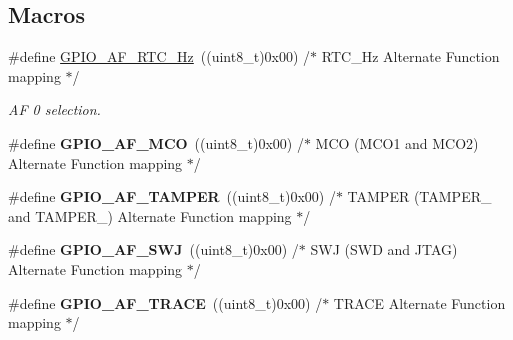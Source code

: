 \subsection*{Macros}
\begin{DoxyCompactItemize}
\item 
\mbox{\label{group___g_p_i_o___alternat__function__selection__define_ga93071f0121fab9f8f13e59c612ed6291}} 
\#define \hyperlink{group___g_p_i_o___alternat__function__selection__define_ga93071f0121fab9f8f13e59c612ed6291}{G\+P\+I\+O\+\_\+\+A\+F\+\_\+\+R\+T\+C\+\_\+Hz}~((uint8\+\_\+t)0x00)  /$\ast$ R\+T\+C\+\_\+Hz Alternate Function mapping $\ast$/
\begin{DoxyCompactList}\small\item\em AF 0 selection. \end{DoxyCompactList}\item 
\mbox{\label{group___g_p_i_o___alternat__function__selection__define_gacfe2ce01055b82d0fcdd93da513f7cc0}} 
\#define {\bfseries G\+P\+I\+O\+\_\+\+A\+F\+\_\+\+M\+CO}~((uint8\+\_\+t)0x00)  /$\ast$ M\+C\+O (\+M\+C\+O1 and M\+C\+O2) Alternate Function mapping $\ast$/
\item 
\mbox{\label{group___g_p_i_o___alternat__function__selection__define_gac284edf4c3267d864b3d56cc6bf6ac95}} 
\#define {\bfseries G\+P\+I\+O\+\_\+\+A\+F\+\_\+\+T\+A\+M\+P\+ER}~((uint8\+\_\+t)0x00)  /$\ast$ T\+A\+M\+P\+E\+R (\+T\+A\+M\+P\+E\+R\+\_ and T\+A\+M\+P\+E\+R\+\_) Alternate Function mapping $\ast$/
\item 
\mbox{\label{group___g_p_i_o___alternat__function__selection__define_ga63cfa7c46dc0c5ab9cdf7340cc95f7fc}} 
\#define {\bfseries G\+P\+I\+O\+\_\+\+A\+F\+\_\+\+S\+WJ}~((uint8\+\_\+t)0x00)  /$\ast$ S\+W\+J (\+S\+W\+D and J\+T\+A\+G) Alternate Function mapping $\ast$/
\item 
\mbox{\label{group___g_p_i_o___alternat__function__selection__define_gac97ace879d6584f8bd705fa1d199d4d4}} 
\#define {\bfseries G\+P\+I\+O\+\_\+\+A\+F\+\_\+\+T\+R\+A\+CE}~((uint8\+\_\+t)0x00)  /$\ast$ T\+R\+A\+C\+E Alternate Function mapping $\ast$/

\end{DoxyCompactItemize}
